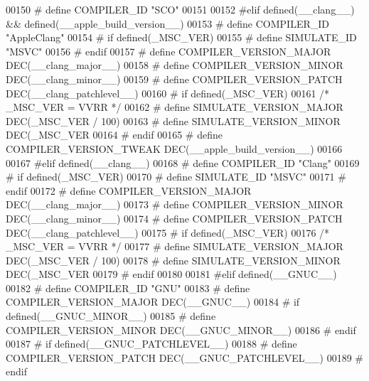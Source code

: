 \begin{DoxyCode}
{{{{{{{{{{{{{{{{{{{{{00150 \textcolor{preprocessor}{# define COMPILER\_ID "SCO"}
00151 
00152 \textcolor{preprocessor}{#elif defined(\_\_clang\_\_) && defined(\_\_apple\_build\_version\_\_)}
00153 \textcolor{preprocessor}{# define COMPILER\_ID "AppleClang"}
00154 \textcolor{preprocessor}{# if defined(\_MSC\_VER)}
00155 \textcolor{preprocessor}{#  define SIMULATE\_ID "MSVC"}
00156 \textcolor{preprocessor}{# endif}
00157 \textcolor{preprocessor}{# define COMPILER\_VERSION\_MAJOR DEC(\_\_clang\_major\_\_)}
00158 \textcolor{preprocessor}{# define COMPILER\_VERSION\_MINOR DEC(\_\_clang\_minor\_\_)}
00159 \textcolor{preprocessor}{# define COMPILER\_VERSION\_PATCH DEC(\_\_clang\_patchlevel\_\_)}
00160 \textcolor{preprocessor}{# if defined(\_MSC\_VER)}
00161    \textcolor{comment}{/* \_MSC\_VER = VVRR */}
00162 \textcolor{preprocessor}{#  define SIMULATE\_VERSION\_MAJOR DEC(\_MSC\_VER / 100)}
00163 \textcolor{preprocessor}{#  define SIMULATE\_VERSION\_MINOR DEC(\_MSC\_VER %
00164 \textcolor{preprocessor}{# endif}
00165 \textcolor{preprocessor}{# define COMPILER\_VERSION\_TWEAK DEC(\_\_apple\_build\_version\_\_)}
00166 
00167 \textcolor{preprocessor}{#elif defined(\_\_clang\_\_)}
00168 \textcolor{preprocessor}{# define COMPILER\_ID "Clang"}
00169 \textcolor{preprocessor}{# if defined(\_MSC\_VER)}
00170 \textcolor{preprocessor}{#  define SIMULATE\_ID "MSVC"}
00171 \textcolor{preprocessor}{# endif}
00172 \textcolor{preprocessor}{# define COMPILER\_VERSION\_MAJOR DEC(\_\_clang\_major\_\_)}
00173 \textcolor{preprocessor}{# define COMPILER\_VERSION\_MINOR DEC(\_\_clang\_minor\_\_)}
00174 \textcolor{preprocessor}{# define COMPILER\_VERSION\_PATCH DEC(\_\_clang\_patchlevel\_\_)}
00175 \textcolor{preprocessor}{# if defined(\_MSC\_VER)}
00176    \textcolor{comment}{/* \_MSC\_VER = VVRR */}
00177 \textcolor{preprocessor}{#  define SIMULATE\_VERSION\_MAJOR DEC(\_MSC\_VER / 100)}
00178 \textcolor{preprocessor}{#  define SIMULATE\_VERSION\_MINOR DEC(\_MSC\_VER %
00179 \textcolor{preprocessor}{# endif}
00180 
00181 \textcolor{preprocessor}{#elif defined(\_\_GNUC\_\_)}
00182 \textcolor{preprocessor}{# define COMPILER\_ID "GNU"}
00183 \textcolor{preprocessor}{# define COMPILER\_VERSION\_MAJOR DEC(\_\_GNUC\_\_)}
00184 \textcolor{preprocessor}{# if defined(\_\_GNUC\_MINOR\_\_)}
00185 \textcolor{preprocessor}{#  define COMPILER\_VERSION\_MINOR DEC(\_\_GNUC\_MINOR\_\_)}
00186 \textcolor{preprocessor}{# endif}
00187 \textcolor{preprocessor}{# if defined(\_\_GNUC\_PATCHLEVEL\_\_)}
00188 \textcolor{preprocessor}{#  define COMPILER\_VERSION\_PATCH DEC(\_\_GNUC\_PATCHLEVEL\_\_)}
00189 \textcolor{preprocessor}{# endif}
}}}}}}}}}}}}}}}}}}}}}}}
\end{DoxyCode}
